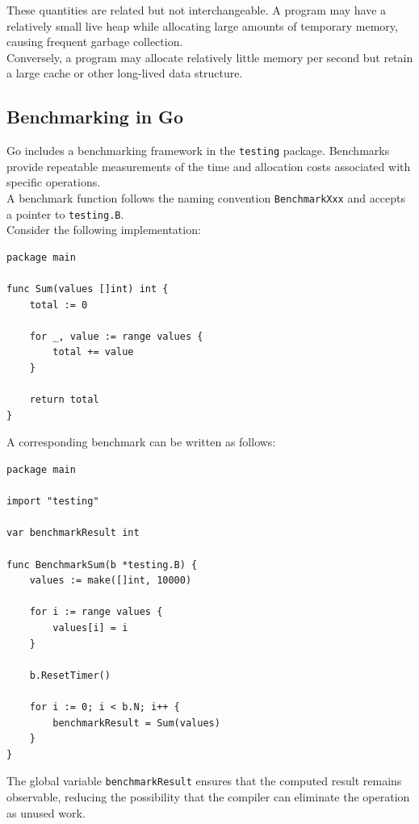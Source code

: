 These quantities are related but not interchangeable. A program may have a relatively small live heap while allocating large amounts of temporary memory, causing frequent garbage collection.\\

Conversely, a program may allocate relatively little memory per second but retain a large cache or other long-lived data structure.

\subsection{Benchmarking in Go}

Go includes a benchmarking framework in the \texttt{testing} package. Benchmarks provide repeatable measurements of the time and allocation costs associated with specific operations.\\

A benchmark function follows the naming convention \texttt{BenchmarkXxx} and accepts a pointer to \texttt{testing.B}.\\

Consider the following implementation:

\begin{lstlisting}
package main

func Sum(values []int) int {
    total := 0

    for _, value := range values {
        total += value
    }

    return total
}
\end{lstlisting}

A corresponding benchmark can be written as follows:

\begin{lstlisting}
package main

import "testing"

var benchmarkResult int

func BenchmarkSum(b *testing.B) {
    values := make([]int, 10000)

    for i := range values {
        values[i] = i
    }

    b.ResetTimer()

    for i := 0; i < b.N; i++ {
        benchmarkResult = Sum(values)
    }
}
\end{lstlisting}

The global variable \texttt{benchmarkResult} ensures that the computed result remains observable, reducing the possibility that the compiler can eliminate the operation as unused work.\\

